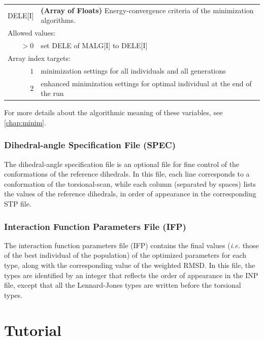 \documentclass[10pt,a4paper,openany]{memoir}
\numberwithin{equation}{section}
\begin{document}
{
\begin{tabular}{r@{ : }l}
\label{descr:dele}
      DELE[I]&\textbf{(Array of Floats)} Energy-convergence criteria of the minimization algorithms.                                          \\ 
\multicolumn{2}{l}{Allowed values:} \\ 
    \(>0\)&set DELE of MALG[I] to DELE[I] \\ 
\multicolumn{2}{l}{Array index targets:} \\ 
  \(1\)&minimization settings for all individuals and all generations \\
  \(2\)&enhanced minimization settings for optimal individual at the end of the run \\
\end{tabular}
\vspace{1ex}
}

\noindent For more details about the algorithmic meaning of these variables, see \autoref{chap:minim}.

\subsection{Dihedral-angle Specification File (SPEC)}
\label{sec:file-formats-spec}

The dihedral-angle specification file is an optional file for fine
control of the conformations of the reference dihedrals. In this file,
each line corresponds to a conformation of the torsional-scan, while
each column (separated by spaces) lists the values of the reference
dihedrals, in order of appearance in the corresponding STP file.

\subsection{Interaction Function Parameters File (IFP)}
\label{sec:file-formats-IFP}

The interaction function parameters file (IFP) contains the final
values (\textit{i.e.} those of the best individual of the population)
of the optimized parameters for each type, along with the
corresponding value of the weighted RMSD. In this file, the types are
identified by an integer that reflects the order of appearance in the
INP file, except that all the Lennard-Jones types are written before
the torsional types.


\chapter{Tutorial}
\label{chap:tutorial}
\end{document}
